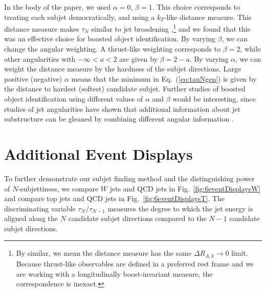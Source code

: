 \documentclass{JHEP3}
\DeclareRobustCommand{\Fig}[1]{Fig.~\ref{#1}}
\DeclareRobustCommand{\Eq}[1]{Eq.~(\ref{#1})}
\begin{document}
In the body of the paper, we used $\alpha = 0$, $\beta=1$.  This choice corresponds to treating each subjet democratically, and using a $k_T$-like distance measure.  This distance measure makes $\tau_N$ similar to jet broadening \cite{Catani:1992jc},\footnote{By similar, we mean the distance measure has the same $\Delta R_{A,k} \rightarrow 0$ limit.  Because thrust-like observables are defined in a preferred rest frame and we are working with a longitudinally boost-invariant measure, the correspondence is inexact.} and we found that this was an effective choice for boosted object identification.  By varying $\beta$, we can change the angular weighting.   A thrust-like \cite{Farhi:1977sg} weighting corresponds to $\beta = 2$, while other angularities \cite{Berger:2003iw} with $-\infty < a < 2$ are given by $\beta = 2 - a$.  By varying $\alpha$, we can weight the distance measure by the hardness of the subjet directions.  Large positive (negative) $\alpha$ means that the minimum in \Eq{eq:tauNgen} is given by the distance to hardest (softest) candidate subjet.   Further studies of boosted object identification using different values of $\alpha$ and $\beta$ would be interesting, since studies of jet angularities have shown that additional information about jet substructure can be gleaned by combining different angular information \cite{Ellis:2010rw}. 


\section{Additional Event Displays}
\label{app:additional_events}

To further demonstrate our subjet finding method and the distinguishing power of $N$-subjettiness, we compare $W$ jets and QCD jets in \Fig{fig:6eventDisplaysW} and compare top jets and QCD jets in \Fig{fig:6eventDisplaysT}.  The discriminating variable $\tau_N/\tau_{N-1}$ measures the degree to which the jet energy is aligned along the $N$ candidate subjet directions compared to the $N-1$ candidate subjet directions.
\end{document}
